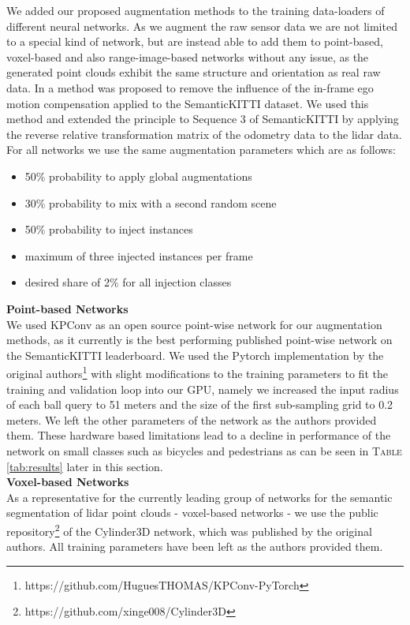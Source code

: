 \documentclass[letterpaper, 10 pt, conference]{ieeeconf}
\begin{document}
We added our proposed augmentation methods to the training data-loaders of different neural networks. As we augment the raw sensor data we are not limited to a special kind of network, but are instead able to add them to point-based, voxel-based and also range-image-based networks without any issue, as the generated point clouds exhibit the same structure and orientation as real raw data. In \cite{triess2020scan} a method was proposed to remove the influence of the in-frame ego motion compensation applied to the SemanticKITTI \cite{behley2019semantickitti} dataset. We used this method and extended the principle to Sequence 3 of SemanticKITTI by applying the reverse relative transformation matrix of the odometry data to the lidar data.
For all networks we use the same augmentation parameters which are as follows:
\begin{itemize}
	\item 50\% probability to apply global augmentations
	\item 30\% probability to mix with a second random scene
	\item 50\% probability to inject instances
	\item maximum of three injected instances per frame
	\item desired share of 2\% for all injection classes


\end{itemize}
\vspace{5pt}

\textbf{Point-based Networks}\\
We used KPConv \cite{thomas2019kpconv} as an open source point-wise network for our augmentation methods, as it currently is the best performing published point-wise network on the SemanticKITTI \cite{behley2019semantickitti} leaderboard. We used the Pytorch implementation by the original authors\footnote{https://github.com/HuguesTHOMAS/KPConv-PyTorch} with slight modifications to the training parameters to fit the training and validation loop into our GPU, namely we increased the input radius of each ball query to 51 meters and the size of the first sub-sampling grid to 0.2 meters. We left the other parameters of the network as the authors provided them. These hardware based limitations lead to a decline in performance of the network on small classes such as bicycles and pedestrians as can be seen in \textsc{Table} \ref{tab:results} later in this section.\\

\textbf{Voxel-based Networks}\\
As a representative for the currently leading group of networks for the semantic segmentation of lidar point clouds - voxel-based networks - we use the public repository\footnote{https://github.com/xinge008/Cylinder3D} of the Cylinder3D \cite{zhou2020cylinder3d} network, which was published by the original authors. All training parameters have been left as the authors provided them.\\
\end{document}
